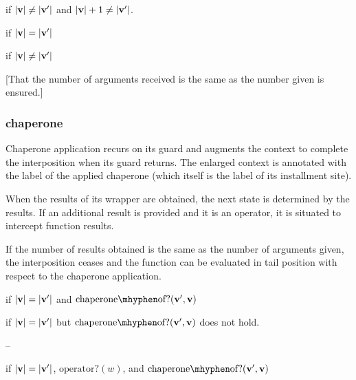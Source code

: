 \documentclass{sigplanconf}
\begin{document}
if $|\mathbf{v}|\ne|\mathbf{v'}|$ and $|\mathbf{v}|+1\ne|\mathbf{v'}|$.







\red{\sval{\impcrk{\vv}::\ks}{\sigma}{\vvp}}{\sval{\ks}{\sigma}{\vvp}}
if $|\mathbf{v}|=|\mathbf{v'}|$

if $|\mathbf{v}|\ne|\mathbf{v'}|$

[That the number of arguments received is the same as the number given is ensured.]



\subsubsection{chaperone}

Chaperone application recurs on its guard and augments the context to complete the interposition when its guard returns.
The enlarged context is annotated with the label of the applied chaperone (which itself is the label of its installment site).


When the results of its wrapper are obtained, the next state is determined by the results.
If an additional result is provided and it is an operator, it is situated to intercept function results.

If the number of results obtained is the same as the number of arguments given, the interposition ceases and the function can be evaluated in tail position with respect to the chaperone application.

if $|\mathbf{v}|=|\mathbf{v'}|$ and $\mathrm{chaperone\mhyphen of?}(\vvp,\vv)$

if $|\mathbf{v}|=|\mathbf{v'}|$ but $\mathrm{chaperone\mhyphen of?}(\vvp,\vv)$ does not hold.

--

if $|\mathbf{v}|=|\mathbf{v'}|$, $\mathrm{operator?}(w)$, and $\mathrm{chaperone\mhyphen of?}(\vvp,\vv)$
\end{document}
